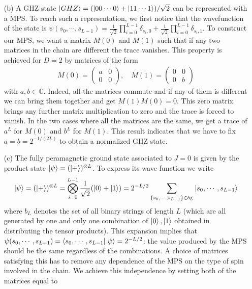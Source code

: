 \documentclass[10pt, a4paper]{article}
\begin{document}
{\begin{enumerate}
  \item[(b)] A GHZ state $\ket{GHZ} = (\ket{00\cdots 0} + \ket{11\cdots 1})/\sqrt{2}$ can be represented with a MPS. To reach such a representation, we first notice that the wavefunction of the state is $\psi(s_0, \cdots, s_{L-1}) = \frac{1}{\sqrt{2}} \prod_{i=0}^{L-1} \delta_{s_i, 0} + \frac{1}{\sqrt{2}} \prod_{i=0}^{L-1} \delta_{s_i, 1}$. To construct our MPS, we want a matrix $M(0)$ and $M(1)$ such that if any two matrices in the chain are different the trace vanishes. This property is achieved for $D=2$ by matrices of the form 
  \begin{align*}
    M(0) = \begin{pmatrix}
      a & 0 \\
      0 & 0
    \end{pmatrix}, \quad
    M(1) = \begin{pmatrix}
      0 & 0 \\
      0 & b
    \end{pmatrix}
  \end{align*}
  with $a, b\in\mathbb{C}$. Indeed, all the matrices commute and if any of them is different we can bring them together and get $M(1)M(0) = 0$. This zero matrix brings any further matrix multiplication to zero and the trace is forced to vanish. In the two cases where all the matrices are the same, we get a trace of $a^{L}$ for $M(0)$ and $b^{L}$ for $M(1)$. This result indicates that we have to fix $a = b = 2^{-1/(2L)}$ to obtain a normalized GHZ state.  
  \item[(c)] The fully peramagnetic ground state associated to $J = 0$ is given by the product state $\ket{\psi} = (\ket{+})^{\otimes L}$. To express its wave function we write 
  \begin{align*}
    \ket{\psi} = (\ket{+})^{\otimes L} = \bigotimes_{i=0}^{L-1} \frac{1}{\sqrt{2}}(\ket{0}+\ket{1}) = 2^{-L/2} \sum_{\{s_0, \cdots, s_{L-1}\} \in b_L} \ket{s_0, \cdots, s_{L-1}}
  \end{align*}
  where $b_L$ denotes the set of all binary strings of length $L$ (which are all generated by one and only one combination of $\ket{0}, \ket{1}$ obtained in distributing the tensor products). This expansion implies that $\psi(s_0, \cdots, s_{L-1}) = \bra{s_0, \cdots, s_{L-1}}\left.{\psi}\right> = 2^{-L/2}$: the value produced by the MPS should be the same regardless of the combinations. A choice of matrices satisfying this has to remove any dependence of the MPS on the type of spin involved in the chain. We achieve this independence by setting both of the matrices equal to 

\end{enumerate}}
\end{document}
